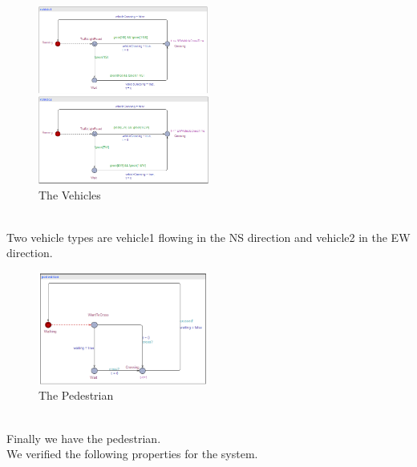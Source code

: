\documentclass[conference]{IEEEtran}
\begin{document}
\begin{figure}[H]
    \centering
    \includegraphics[width=0.5\textwidth]{Fig 8.png}
    \caption{The Vehicles}
\end{figure}
\\
Two vehicle types are vehicle1 flowing in the NS direction and vehicle2 in the EW direction.
\\
\begin{figure}[h]
    \centering
    \includegraphics[width=0.5\textwidth]{Fig 9.png}
    \caption{The Pedestrian}
\end{figure}

\\
Finally we have the pedestrian.
\\

\noindent We verified the following properties for the system.
\\
\end{document}
